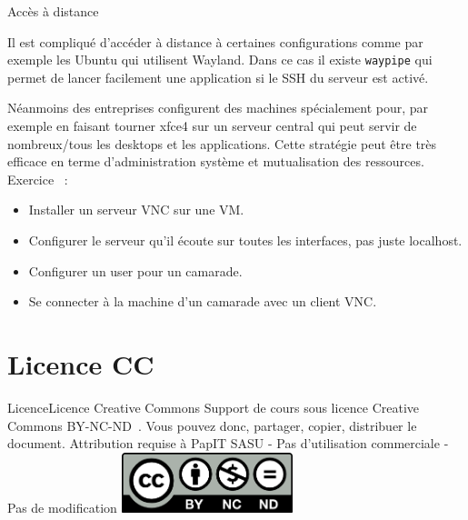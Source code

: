 \documentclass{beamer}
\begin{document}
    \begin{frame}{Accès à distance}
        \begin{footnotesize}
            \begin{dangercolorbox}
                Il est compliqué d'accéder à distance à certaines configurations comme par exemple les Ubuntu qui utilisent Wayland.
                \bigbreak
                Dans ce cas il existe \lstinline{waypipe} qui permet de lancer facilement une application si le SSH du serveur est activé.
            \end{dangercolorbox}
            Néanmoins des entreprises configurent des machines spécialement pour, par exemple en faisant tourner xfce4 sur un serveur central qui peut servir de nombreux/tous les desktops et les applications.
            Cette stratégie peut être très efficace en terme d'administration système et mutualisation des ressources.
            \bigbreak
            Exercice \execcounterdispinc~:
            \begin{itemize}
                \item Installer un serveur VNC sur une VM.
                \item Configurer le serveur qu'il écoute sur toutes les interfaces, pas juste localhost.
                \item Configurer un user pour un camarade.
                \item Se connecter à la machine d'un camarade avec un client VNC.
            \end{itemize}
        \end{footnotesize}
    \end{frame}


    \section{Licence CC}\label{sec:licence}

    \begin{frame}{Licence}{Licence Creative Commons}
        Support de cours sous licence Creative Commons BY-NC-ND~.
        \bigbreak
        Vous pouvez donc, partager, copier, distribuer le document.
        \bigbreak
        Attribution requise à PapIT SASU - Pas d’utilisation commerciale - Pas de modification
        \bigbreak
        \centering
        \includegraphics[width=5cm]{image/by-nc-nd-logo}
    \end{frame}
\end{document}
